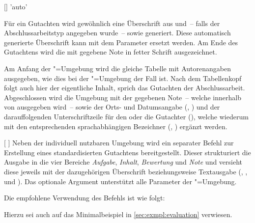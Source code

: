 \begin{Bundle*}{}
\begin{Declaration}{[]}{%
  'auto'%
}
\begin{Declaration}{%
}
\begin{Declaration}{}
Für ein Gutachten wird gewöhnlich eine Überschrift aus  
und~-- falls der Abschlussarbeitstyp angegeben wurde~--  
sowie  generiert. Diese automatisch generierte Überschrift kann 
mit dem Parameter  ersetzt werden. Am 
Ende des Gutachtens wird die mit  
gegebene Note in fetter Schrift ausgezeichnet.

Am Anfang der "=Umgebung wird die gleiche Tabelle mit 
Autorenangaben ausgegeben, wie dies bei der "=Umgebung der 
Fall ist. Nach dem Tabellenkopf folgt auch hier der eigentliche Inhalt, sprich 
das Gutachten der Abschlussarbeit. Abgeschlossen wird die Umgebung mit der 
gegebenen Note~-- welche innerhalb von  ausgegeben wird~-- 
sowie der Orts- und Datumsangabe (, ) und der 
darauffolgenden Unterschriftzeile für den oder die Gutachter (), 
welche wiederum mit den entsprechenden sprachabhängigen Bezeichner 
(, ) ergänzt werden.
\end{Declaration}
\end{Declaration}
\end{Declaration}

\begin{Declaration}{%
  [%
    \LParameter{}%
  ]%
}
\printdeclarationlist%
%
Neben der individuell nutzbaren Umgebung  wird ein 
separater Befehl zur Erstellung eines standardisierten Gutachtens 
bereitgestellt. Dieser strukturiert die Ausgabe in die vier Bereiche 
\emph{Aufgabe}, \emph{Inhalt}, \emph{Bewertung} und \emph{Note} und versieht 
diese jeweils mit der dazugehörigen Überschrift beziehungsweise Textausgabe 
(, ,  und 
). Das optionale Argument unterstützt alle Parameter der 
"=Umgebung.
\end{Declaration}
%
\begin{Example}
Die empfohlene Verwendung des Befehls  ist wie folgt:
\begin{Code}[escapechar=§]
\end{Code}
Hierzu sei auch auf das Minimalbeispiel in \autoref{sec:exmpl:evaluation} 
verwiesen.
%
\end{Example}


\end{Bundle*}
